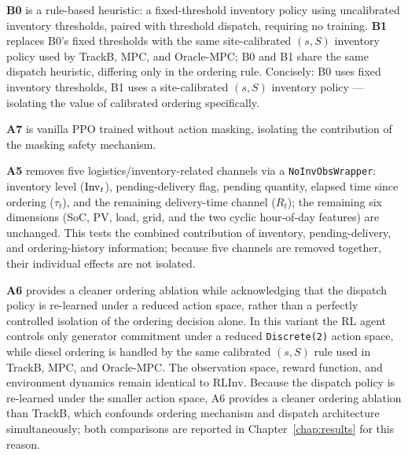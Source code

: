 \textbf{B0} is a rule-based heuristic: a fixed-threshold inventory
policy using uncalibrated inventory thresholds, paired with threshold
dispatch, requiring no training. \textbf{B1} replaces B0's fixed
thresholds with the same site-calibrated $(s,S)$ inventory policy used
by TrackB, MPC, and Oracle-MPC; B0 and B1 share the same dispatch
heuristic, differing only in the ordering rule. Concisely: B0 uses fixed
inventory thresholds, B1 uses a site-calibrated $(s,S)$ inventory
policy --- isolating the value of calibrated ordering specifically.

\textbf{A7} is vanilla PPO trained without action masking, isolating the
contribution of the masking safety mechanism.

\textbf{A5} removes five logistics/inventory-related channels via a
\texttt{NoInvObsWrapper}: inventory level ($\mathrm{Inv}_t$), pending-delivery
flag, pending quantity, elapsed time since ordering ($\tau_t$), and the
remaining delivery-time channel ($R_t$); the remaining six dimensions
(SoC, PV, load, grid, and the two cyclic hour-of-day features) are
unchanged. This tests the combined contribution of inventory,
pending-delivery, and ordering-history information; because five
channels are removed together, their individual effects are not
isolated.

\textbf{A6} provides a cleaner ordering ablation while acknowledging
that the dispatch policy is re-learned under a reduced action space,
rather than a perfectly controlled isolation of the ordering decision
alone. In
this variant the RL agent controls only generator commitment under a
reduced \texttt{Discrete(2)} action space, while diesel ordering is
handled by the same calibrated $(s,S)$ rule used in TrackB, MPC, and
Oracle-MPC. The observation space, reward function, and environment
dynamics remain identical to RLInv. Because the dispatch policy is
re-learned under the smaller action space, A6 provides a cleaner ordering
ablation than TrackB, which confounds ordering mechanism and dispatch
architecture simultaneously; both comparisons are reported in
Chapter~\ref{chap:results} for this reason.

